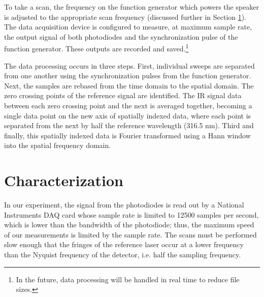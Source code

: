 \documentclass[12pt]{puthesis}
\begin{document}
To take a scan, the frequency on the function generator which powers the speaker is adjusted to the appropriate scan frequency (discussed further in Section \ref{sec:characterization}). The data acquisition device is configured to measure, at maximum sample rate, the output signal of both photodiodes and the synchronization pulse of the function generator. These outputs are recorded and saved.\footnote{In the future, data processing will be handled in real time to reduce file sizes.}

The data processing occurs in three steps. First, individual sweeps are separated from one another using the synchronization pulses from the function generator. Next, the samples are rebased from the time domain to the spatial domain. The zero crossing points of the reference signal are identified. The IR signal data between each zero crossing point and the next is averaged together, becoming a single data point on the new axis of spatially indexed data, where each point is separated from the next by half the reference wavelength (316.5 nm). Third and finally, this spatially indexed data is Fourier transformed using a Hann window into the spatial frequency domain. 







\section{Characterization}
\label{sec:characterization}

In our experiment, the signal from the photodiodes is read out by a National Instruments DAQ card whose sample rate is limited to 12500 samples per second, which is lower than the bandwidth of the photodiode; thus, the maximum speed of our measurements is limited by the sample rate. The scans must be performed slow enough that the fringes of the reference laser occur at a lower frequency than the Nyquist frequency of the detector, i.e. half the sampling frequency.
\end{document}
